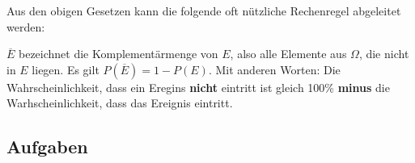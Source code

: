 Aus den obigen Gesetzen kann die folgende oft nützliche Rechenregel abgeleitet werden:

\begin{gesetz}{}{}
 $\overline{E}$ bezeichnet die Komplementärmenge von
  $E$, also alle Elemente aus $\Omega$, die nicht in $E$ liegen. Es gilt $P(\overline{E}) = 1-P(E)$. Mit anderen Worten: Die Wahrscheinlichkeit, dass ein Eregins \textbf{nicht} eintritt ist gleich 100\% \textbf{minus} die Warhscheinlichkeit, dass das Ereignis eintritt.
\end{gesetz}


\subsection*{Aufgaben}

\newpage
